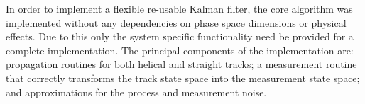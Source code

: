 % 


    In order to implement a flexible re-usable Kalman filter, the core algorithm was implemented without any dependencies on phase space dimensions or physical effects. Due to this only the system specific functionality need be provided for a complete implementation.
    The principal components of the implementation are: propagation routines for both helical and straight tracks; a measurement routine that correctly transforms the track state space into the measurement state space; and approximations for the process and measurement noise.
    
